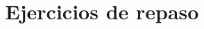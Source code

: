 


\title{Ejercicios de repaso \vspace{-2cm}}
\author{}
\date{ }

\renewcommand\thechoice{\Alph{choice})}
\newcommand\choicelabel{\thechoice}

\newenvironment{choices}%
  {\list{\choicelabel}%
     {\usecounter{choice}\def\makelabel##1{\hss\llap{##1}}%
       \settowidth{\leftmargin}{W.\hskip\labelsep\hskip 2.5em}%
       \def\choice{%
         \item
       } %
       \labelwidth\leftmargin\advance\labelwidth-\labelsep
       \topsep=0pt
       \partopsep=0pt
     }%
  }%
  {\endlist}

\newenvironment{oneparchoices}%
  {%
    \setcounter{choice}{0}%
    \def\choice{%
      \refstepcounter{choice}%
      \ifnum\value{choice}>1\relax
        \penalty -50\hskip 1em plus 1em\relax
      \fi
      \choicelabel
      \nobreak\enskip
    }%
    \ifvmode\else\enskip\fi
    \ignorespaces
  }%
  {}


\maketitle
\fontsize{14}{14}\selectfont

